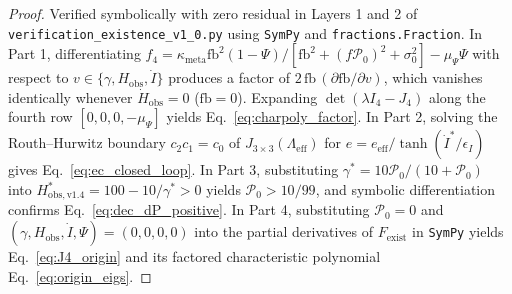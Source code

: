 \documentclass[11pt,a4paper]{article}
\theoremstyle{definition}
\begin{document}
\begin{proof}
Verified symbolically with zero residual in Layers 1 and 2 of \texttt{verification\_existence\_v1\_0.py} using \texttt{SymPy} and \texttt{fractions.Fraction}. In Part 1, differentiating $f_4 = \kappa_{\mathrm{meta}}\mathrm{fb}^2(1-\Psi)/[\mathrm{fb}^2 + (f\mathcal{P}_0)^2 + \sigma_0^2] - \mu_\Psi\Psi$ with respect to $v \in \{\gamma, H_{\mathrm{obs}}, \dot{I}\}$ produces a factor of $2\,\mathrm{fb}\,(\partial\mathrm{fb}/\partial v)$, which vanishes identically whenever $\dot{H}_{\mathrm{obs}} = 0$ ($\mathrm{fb} = 0$). Expanding $\det(\lambda I_4 - J_4)$ along the fourth row $[0,0,0,-\mu_\Psi]$ yields Eq.~\eqref{eq:charpoly_factor}. In Part 2, solving the Routh--Hurwitz boundary $c_2 c_1 = c_0$ of $J_{3\times 3}(\Lambda_{\mathrm{eff}})$ for $e = e_{\mathrm{eff}}/\tanh(\dot{I}^*/\epsilon_I)$ gives Eq.~\eqref{eq:ec_closed_loop}. In Part 3, substituting $\gamma^* = 10\mathcal{P}_0/(10+\mathcal{P}_0)$ into $H_{\mathrm{obs},\mathrm{v1.4}}^* = 100 - 10/\gamma^* > 0$ yields $\mathcal{P}_0 > 10/99$, and symbolic differentiation confirms Eq.~\eqref{eq:dec_dP_positive}. In Part 4, substituting $\mathcal{P}_0 = 0$ and $(\gamma, H_{\mathrm{obs}}, \dot{I}, \Psi) = (0,0,0,0)$ into the partial derivatives of $F_{\mathrm{exist}}$ in \texttt{SymPy} yields Eq.~\eqref{eq:J4_origin} and its factored characteristic polynomial Eq.~\eqref{eq:origin_eigs}.
\end{proof}
\end{document}
